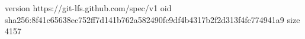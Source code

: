 version https://git-lfs.github.com/spec/v1
oid sha256:8f41c65638ec752ff7d141b762a582490fc9df4b4317b2f2d313f4fc774941a9
size 4157
